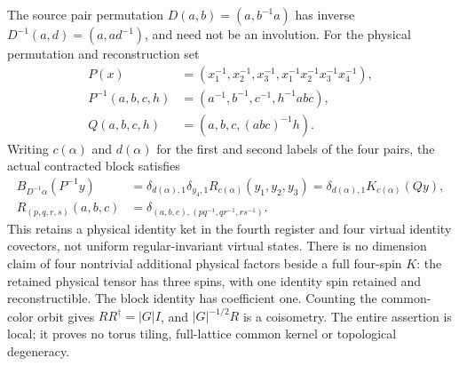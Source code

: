 \documentclass{article}
\begin{document}
The source pair permutation $D(a,b)=(a,b^{-1}a)$ has inverse
$D^{-1}(a,d)=(a,ad^{-1})$, and need not be an involution.
For the physical permutation and reconstruction set
\begin{align}
    P(x)&=(x_1^{-1},x_2^{-1},x_3^{-1},x_1^{-1}x_2^{-1}x_3^{-1}x_4^{-1}),\\
    P^{-1}(a,b,c,h)&=(a^{-1},b^{-1},c^{-1},h^{-1}abc),\\
    Q(a,b,c,h)&=(a,b,c,(abc)^{-1}h).
\end{align}
Writing $c(\alpha)$ and $d(\alpha)$ for the first and second labels of
the four pairs, the actual contracted block satisfies
\begin{align}
    B_{D^{-1}\alpha}(P^{-1}y)
    &=\delta_{d(\alpha),1}\delta_{y_4,1}R_{c(\alpha)}(y_1,y_2,y_3)
      =\delta_{d(\alpha),1}K_{c(\alpha)}(Qy),\\
    R_{(p,q,r,s)}(a,b,c)&=\delta_{(a,b,c),(pq^{-1},qr^{-1},rs^{-1})}.
\end{align}
This retains a physical identity ket in the fourth register and four
virtual identity covectors, not uniform regular-invariant virtual states.
There is no dimension claim of four nontrivial additional physical factors
beside a full four-spin $K$: the retained physical tensor has three spins,
with one identity spin retained and reconstructible. The block identity
has coefficient one. Counting the common-color orbit gives
$RR^\dagger=|G|I$, and $|G|^{-1/2}R$ is a coisometry.
The entire assertion is local; it proves no torus tiling, full-lattice
common kernel or topological degeneracy.
\end{document}
